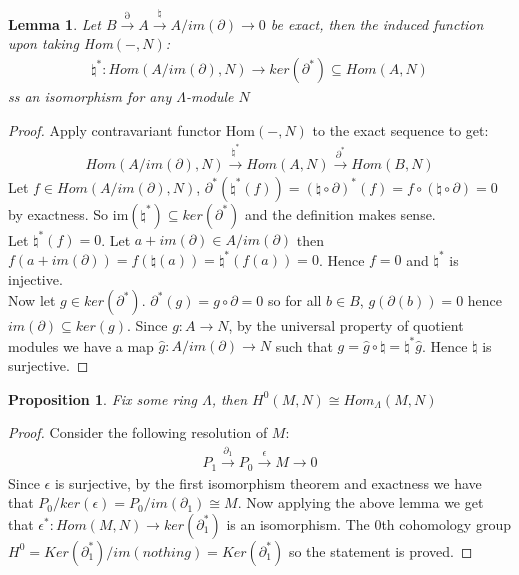 \documentclass[12pt]{book}
\newtheorem{lemma}[theorem]{Lemma}
\newtheorem{proposition}[theorem]{Proposition}
\theoremstyle{definition}
\begin{document}
\begin{lemma}
    Let $B \xrightarrow{\partial} A \xrightarrow{\natural} A/im({\partial}) \rightarrow 0$ be exact, then the induced function upon taking Hom$(-, N)$:
    \begin{align*}
        \natural^* : Hom(A/im(\partial), N) \to ker(\partial^*) \subseteq Hom(A,N)
    \end{align*}
    ss an isomorphism for any $\Lambda$-module $N$
\end{lemma}
\begin{proof}
    Apply contravariant functor Hom$(-, N)$ to the exact sequence to get: 
    \begin{align*}
        Hom(A/im(\partial), N) \xrightarrow{\natural^*} Hom(A, N) \xrightarrow{\partial^*} Hom(B,N)
    \end{align*}
    Let $f \in Hom(A/im(\partial), N)$,  $\partial^*(\natural^*(f)) = (\natural \circ \partial)^*(f) = f \circ (\natural \circ \partial) = 0$ by exactness. So im$(\natural^*) \subseteq ker(\partial^*)$ and the definition makes sense.\\
    Let $\natural^*(f) = 0$. Let $a + im(\partial) \in A/im(\partial)$ then $f(a + im(\partial)) = f(\natural(a)) = \natural^*(f(a)) = 0$. Hence $f = 0$ and $\natural^*$ is injective.\\
    Now let $g \in ker(\partial^*)$. $\partial^*(g) = g \circ \partial = 0$ so for all $b \in B$, $g(\partial(b)) = 0$ hence $im(\partial) \subseteq ker(g)$. Since $g : A \to N$, by the universal property of quotient modules we have a map $\hat{g}: A/im(\partial) \to N$ such that $ g = \hat{g} \circ \natural = \natural^*\hat{g}$. Hence $\natural$ is surjective.
\end{proof}

\begin{proposition}
    Fix some ring $\Lambda$, then $H^0(M, N) \cong Hom_\Lambda(M,N)$
\end{proposition}
\begin{proof}
    Consider the following resolution of $M$: 
    \begin{align*}
        P_1 \xrightarrow{\partial_1} P_0 \xrightarrow{\epsilon} M \rightarrow 0
    \end{align*}
    Since $\epsilon$ is surjective, by the first isomorphism theorem and exactness we have that $P_0/ker(\epsilon) = P_0/im(\partial_1) \cong M$. Now applying the above lemma we get that $\epsilon^* : Hom(M, N) \to ker(\partial_1^*)$ is an isomorphism. The $0$th cohomology group $H^0 = Ker(\partial^*_1)/im(nothing) = Ker(\partial^*_1)$ so the statement is proved. 
\end{proof}
\end{document}
